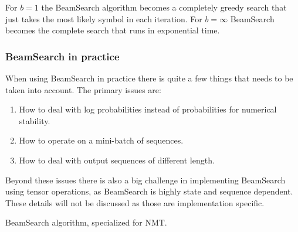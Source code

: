 For $b = 1$ the BeamSearch algorithm becomes a completely greedy search that just takes the most likely symbol in each iteration. For $b = \infty$ BeamSearch becomes the complete search that runs in exponential time.

\subsubsection{BeamSearch in practice}

When using BeamSearch in practice there is quite a few things that needs to be taken into account. The primary issues are:
\begin{enumerate}
\item How to deal with log probabilities instead of probabilities for numerical stability.
\item How to operate on a mini-batch of sequences.
\item How to deal with output sequences of different length.
\end{enumerate}

Beyond these issues there is also a big challenge in implementing BeamSearch using tensor operations, as BeamSearch is highly state and sequence dependent. These details will not be discussed as those are implementation specific.

\begin{algorithm}[H]
  \caption{BeamSearch algorithm, specialized for NMT.}
  \begin{algorithmic}[1]
      \Repeat
         
         
         
        \State
         
         
        \State
         
         
        \State
      \State {}
    \EndFunction
  \end{algorithmic}
  \label{alg:theory:semi-supervised:nmt}
\end{algorithm}

